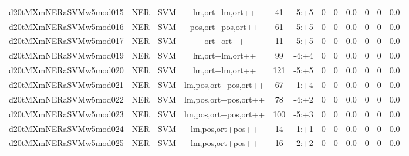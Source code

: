 \documentclass[a4paper]{article}
\begin{document}
\begin{landscape}
\begin{center}
\begin{tabular}{ |c|c|c|c|c|c|c|c|c|c|c|c|}
 
 	
 	\small{ d20tMXmNERaSVMw5mod015 } & \small{ NER} & \small{  SVM }  & lm,ort+lm,ort++  &  41 &  \small{  -5:+5 }  &  0 & 0 & 0.0  &  0 & 0 & 0.0 \\
 	

 
 	
 	\small{ d20tMXmNERaSVMw5mod016 } & \small{ NER} & \small{  SVM }  & pos,ort+pos,ort++  &  61 &  \small{  -5:+5 }  &  0 & 0 & 0.0  &  0 & 0 & 0.0 \\
 	

 
 	
 	\small{ d20tMXmNERaSVMw5mod017 } & \small{ NER} & \small{  SVM }  & ort+ort++  &  11 &  \small{  -5:+5 }  &  0 & 0 & 0.0  &  0 & 0 & 0.0 \\
 	

 
 	
 	\small{ d20tMXmNERaSVMw5mod019 } & \small{ NER} & \small{  SVM }  & lm,ort+lm,ort++  &  99 &  \small{  -4:+4 }  &  0 & 0 & 0.0  &  0 & 0 & 0.0 \\
 	

 
 	
 	\small{ d20tMXmNERaSVMw5mod020 } & \small{ NER} & \small{  SVM }  & lm,ort+lm,ort++  &  121 &  \small{  -5:+5 }  &  0 & 0 & 0.0  &  0 & 0 & 0.0 \\
 	

 
 	
 	\small{ d20tMXmNERaSVMw5mod021 } & \small{ NER} & \small{  SVM }  & lm,pos,ort+pos,ort++  &  67 &  \small{  -1:+4 }  &  0 & 0 & 0.0  &  0 & 0 & 0.0 \\
 	

 
 	
 	\small{ d20tMXmNERaSVMw5mod022 } & \small{ NER} & \small{  SVM }  & lm,pos,ort+pos,ort++  &  78 &  \small{  -4:+2 }  &  0 & 0 & 0.0  &  0 & 0 & 0.0 \\
 	

 
 	
 	\small{ d20tMXmNERaSVMw5mod023 } & \small{ NER} & \small{  SVM }  & lm,pos,ort+pos,ort++  &  100 &  \small{  -5:+3 }  &  0 & 0 & 0.0  &  0 & 0 & 0.0 \\
 	

 
 	
 	\small{ d20tMXmNERaSVMw5mod024 } & \small{ NER} & \small{  SVM }  & lm,pos,ort+pos++  &  14 &  \small{  -1:+1 }  &  0 & 0 & 0.0  &  0 & 0 & 0.0 \\
 	

 
 	
 	\small{ d20tMXmNERaSVMw5mod025 } & \small{ NER} & \small{  SVM }  & lm,pos,ort+pos++  &  16 &  \small{  -2:+2 }  &  0 & 0 & 0.0  &  0 & 0 & 0.0 \\
 	


\end{tabular}
\end{center}
\end{landscape}
\end{document}
